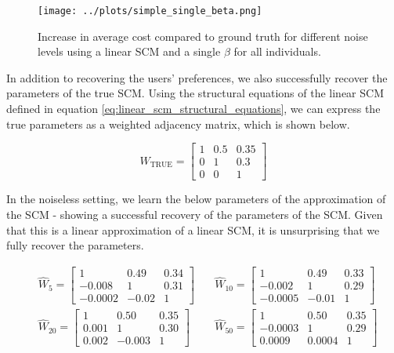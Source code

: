 \begin{figure}[!htb]
	\centering
	\texttt{[image: ../plots/simple\_single\_beta.png]}
	\caption{Increase in average cost compared to ground truth for different noise levels using a linear SCM and a single $\beta$ for all individuals.}
	\label{fig:simple_single_beta}
\end{figure}

In addition to recovering the users' preferences, we also successfully recover the parameters of the true SCM. Using the structural equations of the linear SCM defined in equation \ref{eq:linear_scm_structural_equations}, we can express the true parameters as a weighted adjacency matrix, which is shown below.

\begin{equation}
	W_{\text{TRUE}} = 
	\begin{bmatrix}
		1 & 0.5 & 0.35 \\
		0 & 1 & 0.3 \\
		0 & 0 & 1
	\end{bmatrix}
\end{equation}

In the noiseless setting, we learn the below parameters of the approximation of the SCM - showing a successful recovery of the parameters of the SCM. Given that this is a linear approximation of a linear SCM, it is unsurprising that we fully recover the parameters.

\begin{align}
	& \hat{W}_5 =
	\begin{bmatrix}
		1 & 0.49 & 0.34 \\
		-0.008 & 1 & 0.31 \\
		-0.0002 & -0.02 & 1
	\end{bmatrix}
	\quad
	& \hat{W}_{10} =
	\begin{bmatrix}
		1 & 0.49 & 0.33 \\
		-0.002 & 1 & 0.29 \\
		-0.0005 & -0.01 & 1
	\end{bmatrix} \\ \nonumber
	& \hat{W}_{20} =
	\begin{bmatrix}
		1 & 0.50 & 0.35 \\
		0.001 & 1 & 0.30 \\
		0.002 & -0.003 & 1
	\end{bmatrix}
	& \hat{W}_{50} =
	\begin{bmatrix}
		1 & 0.50 & 0.35 \\
		-0.0003 & 1 & 0.29 \\
		0.0009 & 0.0004 & 1
	\end{bmatrix}
\end{align}


